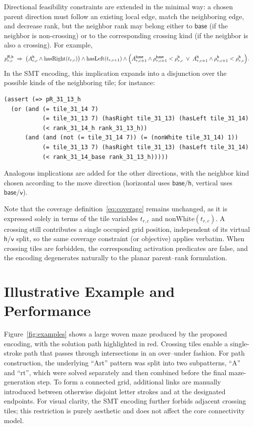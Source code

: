 \documentclass[letterpaper,11pt]{article}
\newcommand{\kind}[1]{\mathsf{#1}}
\begin{document}
Directional feasibility constraints are extended in the minimal way: a
chosen parent direction must follow an existing local edge, match the
neighboring edge, and decrease rank, but the neighbor rank may belong
either to \(\kind{base}\) (if the neighbor is non-crossing) or to the
corresponding crossing kind (if the neighbor is also a crossing). For
example,
\[
p^{\kind{R},\kind{h}}_{r,c}\;\Rightarrow\;
\bigl(A^{\kind{h}}_{r,c}\wedge \mathrm{hasRight}(t_{r,c})\bigr)
\wedge
\mathrm{hasLeft}(t_{r,c+1})
\wedge
\Bigl(
A^{\kind{base}}_{r,c+1}\wedge \rho^{\kind{base}}_{r,c+1}<\rho^{\kind{h}}_{r,c}
\;\vee\;
A^{\kind{h}}_{r,c+1}\wedge \rho^{\kind{h}}_{r,c+1}<\rho^{\kind{h}}_{r,c}
\Bigr).
\]
In the SMT encoding, this implication expands into a disjunction over
the possible kinds of the neighboring tile; for instance:
\begin{tcolorbox}[smtsimple]
\begin{verbatim}
(assert (=> pR_31_13_h
  (or (and (= tile_31_14 7)
           (= tile_31_13 7) (hasRight tile_31_13) (hasLeft tile_31_14)
           (< rank_31_14_h rank_31_13_h))
      (and (and (not (= tile_31_14 7)) (= (nonWhite tile_31_14) 1))
           (= tile_31_13 7) (hasRight tile_31_13) (hasLeft tile_31_14)
           (< rank_31_14_base rank_31_13_h)))))
\end{verbatim}
\end{tcolorbox}

Analogous implications are added for the other directions, with the
neighbor kind chosen according to the move direction (horizontal uses
\(\kind{base}/\kind{h}\), vertical uses \(\kind{base}/\kind{v}\)).

Note that the coverage definition~\eqref{eq:coverage} remains
unchanged, as it is expressed solely in terms of the tile variables
\(t_{r,c}\) and \(\mathrm{nonWhite}(t_{r,c})\). A crossing still
contributes a single occupied grid position, independent of its
virtual \(\kind{h}/\kind{v}\) split, so the same coverage constraint
(or objective) applies verbatim. When crossing tiles are forbidden,
the corresponding activation predicates are false, and the encoding
degenerates naturally to the planar parent--rank formulation.

\section*{Illustrative Example and Performance}

Figure~\ref{fig:examples} shows a large woven maze produced by the
proposed encoding, with the solution path highlighted in red. Crossing
tiles enable a single-stroke path that passes through intersections in
an over--under fashion. For path construction, the underlying ``Art''
pattern was split into two subpatterns, ``A'' and ``rt'', which were
solved separately and then combined before the final maze-generation
step. To form a connected grid, additional links are manually
introduced between otherwise disjoint letter strokes and at the
designated endpoints. For visual clarity, the SMT encoding further
forbids adjacent crossing tiles; this restriction is purely aesthetic
and does not affect the core connectivity model.
\end{document}
